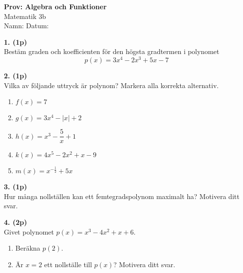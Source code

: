 \documentclass[12pt]{article}
\begin{document}
\begin{center}
\Large\textbf{Prov: Algebra och Funktioner} \\
\large Matematik 3b \\[0.5cm]
\normalsize
Namn: \underline{\hspace{6cm}} \quad Datum: \underline{\hspace{3cm}}
\end{center}

\vspace{0.5cm}


\noindent
\textbf{1. (1p)} \\
Bestäm graden och koefficienten för den högsta gradtermen i polynomet
\[
 p(x) = 3x^4 - 2x^3 + 5x - 7
\]

\vspace{0.5cm}

\noindent
\textbf{2. (1p)} \\
Vilka av följande uttryck är polynom? Markera alla korrekta alternativ.
\begin{enumerate}[label=$\square$ \alph*)]
    \item $f(x) = 7$
    \item $g(x) = 3x^4 - \lvert x \rvert + 2$
    \item $h(x) = x^3 - \dfrac{5}{x} + 1$
    \item $k(x) = 4x^5 - 2x^2 + x - 9$
    \item $m(x) = x^{-\tfrac{1}{2}} + 5x$
\end{enumerate}

\vspace{0.5cm}

\noindent
\textbf{3. (1p)} \\
Hur många nollställen kan ett femtegradspolynom maximalt ha? Motivera ditt svar.

\vspace{0.5cm}

\noindent
\textbf{4. (2p)} \\
Givet polynomet $p(x) = x^3 - 4x^2 + x + 6$.
\begin{enumerate}[label=\alph*)]
    \item Beräkna $p(2)$.
    \item Är $x = 2$ ett nollställe till $p(x)$? Motivera ditt svar.
\end{enumerate}

\vspace{0.5cm}
\end{document}
